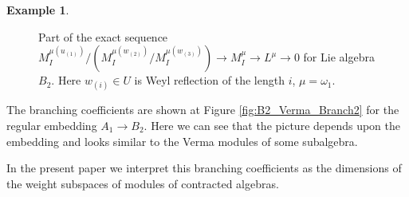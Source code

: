 \documentclass[12pt]{article}
\theoremstyle{definition}
\newtheorem{example}{Example}
\begin{document}
\begin{example}
\begin{figure}[h!bt]
 \noindent{}
 \caption{Part of the exact sequence
   $M_{I}^{\mu(u_{(1)})}/\left(M_{I}^{\mu(w_{(2)})}/M_{I}^{\mu(w_{(3)})}\right)\to M^{\mu}_{I}\to
   L^{\mu}\to 0 $ for Lie algebra $B_2$. Here $w_{(i)}\in  U$ is Weyl reflection of the length $i$, $\mu=\omega_{1}$.}

\end{figure}


The branching coefficients are shown at Figure \ref{fig:B2_Verma_Branch2}
for the regular embedding $A_{1}\rightarrow B_{2}$. Here we can
see that the picture depends upon the embedding and looks similar to the
Verma modules of some subalgebra.

\end{example}
In the present paper we interpret this branching coefficients as the dimensions
of the weight subspaces of modules of contracted algebras.
\end{document}
